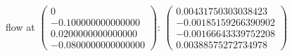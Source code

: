 \documentclass{article}
\begin{document}
\begin{align*}
\end{align*}flow at $\left(\begin{array}{c}
  0\\
  -0.100000000000000\\
  0.0200000000000000\\
  -0.0800000000000000
\end{array}\right)$: $\left(\begin{array}{c}
  0.00431750303038423\\
  -0.00185159266390902\\
  -0.00166643339752208\\
  0.00388575272734978
\end{array}\right)$
\end{document}
